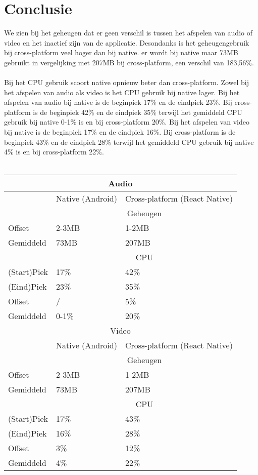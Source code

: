 \section{Conclusie}
We zien bij het geheugen dat er geen verschil is tussen het afspelen van audio of video 
en het inactief zijn van de applicatie. Desondanks is het geheugengebruik bij cross-platform veel 
hoger dan bij native. er wordt bij native maar 73MB gebruikt in vergelijking met 207MB 
bij cross-platform, een verschil van 183,56\%.
\\\\
Bij het CPU gebruik scoort native opnieuw beter dan cross-platform. Zowel bij het afspelen van audio als video 
is het CPU gebruik bij native lager. Bij het afspelen van audio bij 
native is de beginpiek 17\% en de eindpiek 23\%. Bij cross-platform is de 
beginpiek 42\% en de eindpiek 35\% terwijl het gemiddeld CPU gebruik bij native 0-1\% is en bij
cross-platform 20\%. Bij het afspelen van video bij native is de beginpiek 17\% en de eindpiek 16\%.
Bij cross-platform is de beginpiek 43\% en de eindpiek 28\% terwijl het gemiddeld CPU gebruik bij
native 4\% is en bij cross-platform 22\%. 
\\\\
\begin{tabular}{ |p{3cm}||p{5cm}|p{5cm}| }
    \hline
    \multicolumn{3}{|c|}{Audio} \\ 
    \hline
     & Native (Android) & Cross-platform (React Native) \\
    \hline
     & \multicolumn{2}{|c|}{Geheugen} \\ 
    \hline
    Offset & 2-3MB & 1-2MB \\
    Gemiddeld & 73MB & 207MB \\
    \hline
     & \multicolumn{2}{|c|}{CPU} \\
    \hline
    (Start)Piek & 17\% & 42\% \\
    (Eind)Piek & 23\% & 35\% \\
    Offset & / & 5\% \\
    Gemiddeld & 0-1\% & 20\% \\
    \hline
    \multicolumn{3}{|c|}{Video} \\ 
    \hline
     & Native (Android) & Cross-platform (React Native) \\
    \hline
     & \multicolumn{2}{|c|}{Geheugen} \\ 
    \hline
    Offset & 2-3MB & 1-2MB \\
    Gemiddeld & 73MB & 207MB \\
    \hline
     & \multicolumn{2}{|c|}{CPU} \\
    \hline
    (Start)Piek & 17\% & 43\% \\
    (Eind)Piek & 16\% & 28\% \\
    Offset & 3\% & 12\% \\
    Gemiddeld & 4\% & 22\% \\
    \hline
\end{tabular}
